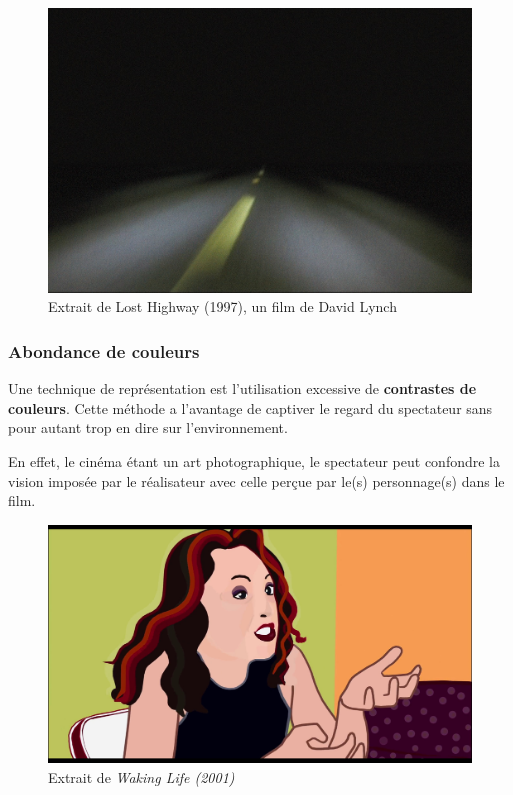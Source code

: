 \documentclass[../main.tex]{subfile}
\begin{document}
\begin{figure}[htpb]
    \centering
    \includegraphics[width=\linewidth]{images/lynch}
    \caption{Extrait de Lost Highway (1997), un film de David Lynch}
    \label{fig:images_lynch}
\end{figure}

\subsubsection{Abondance de couleurs}

Une technique de représentation est l'utilisation excessive de
\textbf{contrastes de couleurs}. Cette méthode a l'avantage de captiver le
regard du spectateur sans pour autant trop en dire sur l'environnement.

En effet, le cinéma étant un art photographique, le spectateur peut confondre
la vision imposée par le réalisateur avec celle perçue par le(s) personnage(s)
dans le film.

\begin{figure}[htpb]
    \centering
    \includegraphics[width=\linewidth]{images/colors}
    \caption{Extrait de \emph{Waking Life (2001)}}
    \label{fig:images_colors}
\end{figure}
\end{document}
